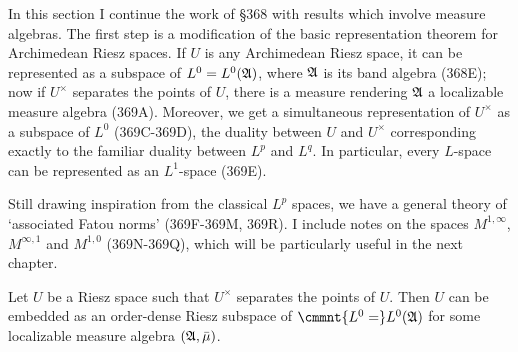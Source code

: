      
\def\chaptername{Function spaces}
\def\sectionname{Banach function spaces}
     
     
In this section I continue the work of \S368 with results which involve
measure algebras.   The first step is a modification of the basic
representation theorem for Archimedean Riesz spaces.   If $U$ is any
Archimedean Riesz space, it can be represented as a subspace of
$L^0=L^0(\frak A)$, where $\frak A$ is its band algebra (368E);
now if $U^{\times}$ separates the points of $U$, there is a measure
rendering $\frak A$ a localizable measure algebra
(369A).
Moreover, we get a simultaneous representation of $U^{\times}$ as a
subspace of $L^0$ (369C-369D), the duality between $U$ and $U^{\times}$ corresponding exactly to the familiar duality between $L^p$ and $L^q$.
In particular, every $L$-space can be represented as an $L^1$-space (369E).
     
Still drawing inspiration from the classical $L^p$ spaces, we have a
general theory of `associated Fatou norms' (369F-369M, 369R).   I
include notes on the spaces $M^{1,\infty}$, $M^{\infty,1}$ and $M^{1,0}$
(369N-369Q), which will be particularly useful in the next chapter.
     
 Let $U$ be a Riesz space such that $U^{\times}$
separates the points of $U$.   Then $U$ can be embedded as an
order-dense Riesz subspace of $\cmmnt{L^0=}L^0(\frak A)$ for some 
localizable measure algebra $(\frak A,\bar\mu)$.
     
